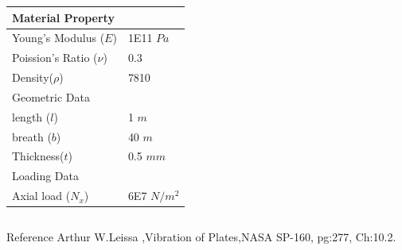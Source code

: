 \documentclass[9pt]{beamer}
\begin{document}
\begin{frame}
\begin{columns}
\begin{table}[ht]
\renewcommand{\arraystretch}{1.5}
\centering
\begin{tabular}{ll}
\hline
\multicolumn{2}{l}{Material Property} \\ \hline  \hline
Young's Modulus ($E$)          &1E11 $Pa$        \\
Poission's Ratio ($\nu$)       & 0.3            \\ 
Density($\rho$)       &     7810         \\ 
    \hline
    \multicolumn{2}{l}{Geometric Data} \\ \hline  \hline
            length ($l$)        & 1 $m$   \\
            breath ($b$)        & 40 $m$   \\
            Thickness($t$)     &         0.5 $mm$  \\
             \hline
                \multicolumn{2}{l}{Loading Data} \\ \hline  \hline
            Axial load ($N_x$)        & 6E7 $N/m^2$   \\
             \hline
\end{tabular}
\end{table}






\end{columns}
\begin{block}{Reference}
Arthur W.Leissa ,Vibration of Plates,NASA SP-160, pg:277, Ch:10.2. \\
\end{block}
\end{frame}
\end{document}
